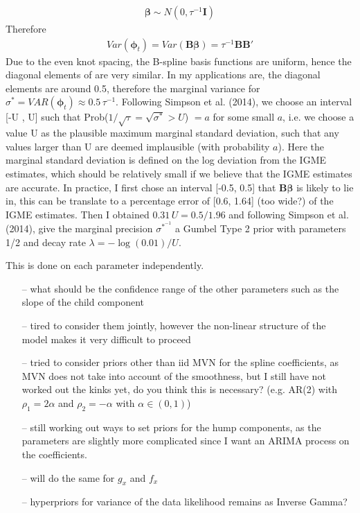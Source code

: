 \documentclass[12pt,a4paper]{article}
\begin{document}
\begin{align*}
\boldsymbol{\beta} \sim N(0, \tau^{-1} \boldsymbol{I})
\end{align*} 
Therefore 
\begin{align*}
Var(\boldsymbol{\phi}_t) = Var(\boldsymbol{B\beta}) = \tau^{-1} \boldsymbol{BB'}
\end{align*} 
Due to the even knot spacing, the B-spline basis functions are uniform, hence the diagonal elements of  are very similar. In my applications are, the diagonal elements are around 0.5, therefore the marginal variance for $ \sigma^* = VAR(\boldsymbol{\phi}_t) \approx  0.5 \, \tau^{-1}$. Following Simpson et al. (2014), we choose an interval [-U , U] such that Prob($1/ \sqrt{\tau} = \sqrt{\sigma^*} > U$) $= a$ for some small $a$, i.e. we choose a value U as the plausible maximum marginal standard deviation, such that any values larger than U are deemed implausible (with probability $a$). Here the marginal standard deviation is defined on the log deviation from the IGME estimates, which should be relatively small if we believe that the IGME estimates are accurate. In practice, I first chose an interval [-0.5, 0.5] that $\boldsymbol{B\beta}$ is likely to lie in, this can be translate to a percentage error of [0.6, 1.64] (too wide?) of the IGME estimates. Then I obtained $0.31 \, U = 0.5/1.96$ and following Simpson et al. (2014), give the marginal precision $\sigma^*^{-1}$ a Gumbel Type 2 prior with parameters 1/2 and decay rate $\lambda = - \log(0.01)/U$. 

This is done on each parameter independently.
\begin{itemize}
\item[--] what should be the confidence range of the other parameters such as the slope of the child component
\item[--] tired to consider them jointly, however the non-linear structure of the model makes it very difficult to proceed
\item[--] tried to consider priors other than iid MVN for the spline coefficients, as MVN does not take into account of the smoothness, but I still have not worked out the kinks yet, do you think this is necessary? (e.g. AR(2) with $\rho_1 = 2 \alpha$ and $\rho_2 = -\alpha$ with $\alpha \in (0,1)$)
\item[--] still working out ways to set priors for the hump components, as the parameters are slightly more complicated since I want an ARIMA process on the coefficients.
\item[--] will do the same for $g_x$ and $f_x$
\item[--] hyperpriors for variance of the data likelihood remains as Inverse Gamma?
\end{itemize}
\end{document}
